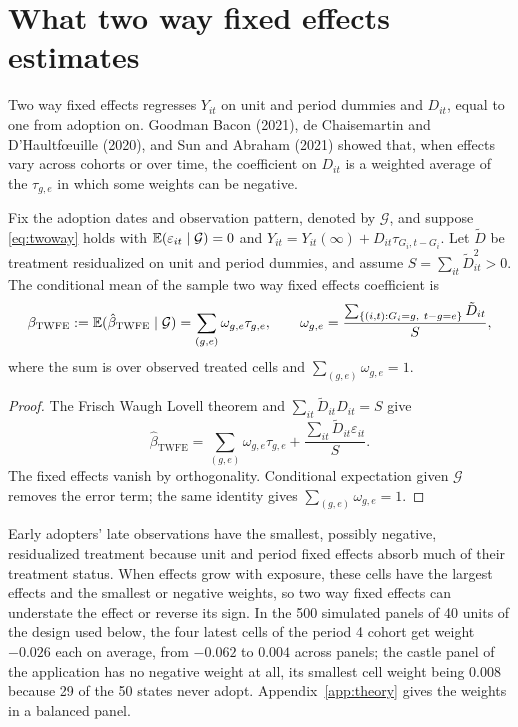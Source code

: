 \section{What two way fixed effects estimates}

Two way fixed effects regresses $Y_{it}$ on unit and period dummies and $D_{it}$, equal to one from adoption on. Goodman Bacon (2021), de Chaisemartin and D'Haultf\oe uille (2020), and Sun and Abraham (2021) showed that, when effects vary across cohorts or over time, the coefficient on $D_{it}$ is a weighted average of the $\tau_{g,e}$ in which some weights can be negative.

\begin{proposition}\label{prop:twfe}
Fix the adoption dates and observation pattern, denoted by $\mathcal G$, and suppose \eqref{eq:twoway} holds with $\mathbb{E}(\varepsilon_{it}\mid\mathcal G)=0$ and $Y_{it}=Y_{it}(\infty)+D_{it}\tau_{G_i,t-G_i}$. Let $\tilde D$ be treatment residualized on unit and period dummies, and assume $S=\sum_{it}\tilde D_{it}^2>0$. The conditional mean of the sample two way fixed effects coefficient is
\[
\beta_{\mathrm{TWFE}}:=\mathbb{E}(\hat\beta_{\mathrm{TWFE}}\mid\mathcal G)=\sum_{(g,e)}\omega_{g,e}\tau_{g,e},\qquad
\omega_{g,e}=\frac{\sum_{\{(i,t):G_i=g,\ t-g=e\}}\tilde D_{it}}{S},
\]
where the sum is over observed treated cells and $\sum_{(g,e)}\omega_{g,e}=1$.
\end{proposition}

\begin{proof}
The Frisch Waugh Lovell theorem and $\sum_{it}\tilde D_{it}D_{it}=S$ give
\[
\hat\beta_{\mathrm{TWFE}}=\sum_{(g,e)}\omega_{g,e}\tau_{g,e}+\frac{\sum_{it}\tilde D_{it}\varepsilon_{it}}{S}.
\]
The fixed effects vanish by orthogonality. Conditional expectation given $\mathcal G$ removes the error term; the same identity gives $\sum_{(g,e)}\omega_{g,e}=1$.
\end{proof}

Early adopters' late observations have the smallest, possibly negative, residualized treatment because unit and period fixed effects absorb much of their treatment status. When effects grow with exposure, these cells have the largest effects and the smallest or negative weights, so two way fixed effects can understate the effect or reverse its sign. In the 500 simulated panels of 40 units of the design used below, the four latest cells of the period 4 cohort get weight $-0.026$ each on average, from $-0.062$ to $0.004$ across panels; the castle panel of the application has no negative weight at all, its smallest cell weight being 0.008 because 29 of the 50 states never adopt. Appendix~\ref{app:theory} gives the weights in a balanced panel.

